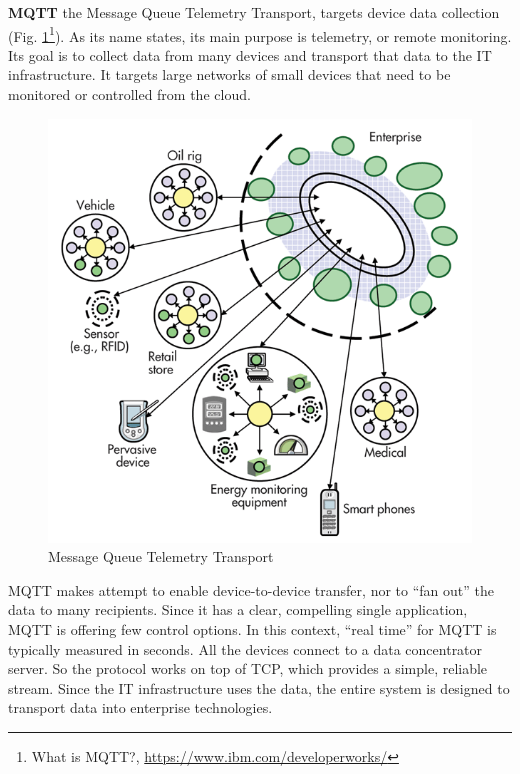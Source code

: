      \textbf{MQTT}
      \newline
      the Message Queue Telemetry Transport, targets device data collection (Fig. \ref{img:MQTT}\footnote{What is MQTT?, \url{https://www.ibm.com/developerworks/}}). As its name states, its main purpose is telemetry, or remote monitoring. Its goal is to collect data from many devices and transport that data to the IT infrastructure. It targets large networks of small devices that need to be monitored or controlled from the cloud.
      \begin{figure}[!ht]
      \centering
      \includegraphics[scale=0.6]{images/MQTT.png}   
      \caption[Message Queue Telemetry Transport]{Message Queue Telemetry Transport}
      \label{img:MQTT}                           
      \end{figure}
      MQTT makes attempt to enable device-to-device transfer, nor to ``fan out'' the data to many recipients. Since it has a clear, compelling single application, MQTT is offering few control options. In this context, ``real time'' for MQTT is typically measured in seconds. All the devices connect to a data concentrator server. So the protocol works on top of TCP, which provides a simple, reliable stream. Since the IT infrastructure uses the data, the entire system is designed to transport data into enterprise technologies.

